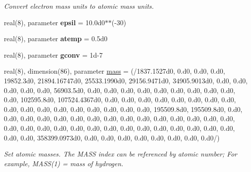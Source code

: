 \begin{DoxyCompactItemize}
\begin{DoxyCompactList}\small\item\em Convert electron mass units to atomic mass units. \end{DoxyCompactList}\item 
\mbox{\label{namespaceconstants_a20857cef9be2cb4adf2011fd70db3458}} 
real(8), parameter {\bfseries epsil} = 10.\+0d0$\ast$$\ast$(-\/30)
\item 
\mbox{\label{namespaceconstants_a69627ad3a30781eec0f177855b87a718}} 
real(8), parameter {\bfseries atemp} = 0.\+5d0
\item 
\mbox{\label{namespaceconstants_aa6a2522f7223637a44c105cd6071a9b4}} 
real(8), parameter {\bfseries gconv} = 1d-\/7
\item 
\mbox{\label{namespaceconstants_a43c37b4fb9951c15e43c401271bfbc38}} 
real(8), dimension(86), parameter \mbox{\hyperlink{namespaceconstants_a43c37b4fb9951c15e43c401271bfbc38}{mass}} = (/1837.\+1527d0, 0.\+d0, 0.\+d0, 0.\+d0, 19852.\+3d0, 21894.\+16747d0, 25533.\+1990d0, 29156.\+9471d0, 34905.\+9013d0, 0.\+d0, 0.\+d0, 0.\+d0, 0.\+d0, 0.\+d0, 56903.\+5d0, 0.\+d0, 0.\+d0, 0.\+d0, 0.\+d0, 0.\+d0, 0.\+d0, 0.\+d0, 0.\+d0, 0.\+d0, 0.\+d0, 102595.\+8d0, 107524.\+4367d0, 0.\+d0, 0.\+d0, 0.\+d0, 0.\+d0, 0.\+d0, 0.\+d0, 0.\+d0, 0.\+d0, 0.\+d0, 0.\+d0, 0.\+d0, 0.\+d0, 0.\+d0, 0.\+d0, 0.\+d0, 0.\+d0, 0.\+d0, 195509.\+8d0, 195509.\+8d0, 0.\+d0, 0.\+d0, 0.\+d0, 0.\+d0, 0.\+d0, 0.\+d0, 0.\+d0, 0.\+d0, 0.\+d0, 0.\+d0, 0.\+d0, 0.\+d0, 0.\+d0, 0.\+d0, 0.\+d0, 0.\+d0, 0.\+d0, 0.\+d0, 0.\+d0, 0.\+d0, 0.\+d0, 0.\+d0, 0.\+d0, 0.\+d0, 0.\+d0, 0.\+d0, 0.\+d0, 0.\+d0, 0.\+d0, 0.\+d0, 0.\+d0, 358399.\+0973d0, 0.\+d0, 0.\+d0, 0.\+d0, 0.\+d0, 0.\+d0, 0.\+d0, 0.\+d0, 0.\+d0/)
\begin{DoxyCompactList}\small\item\em Set atomic masses. The M\+A\+SS index can be referenced by atomic number; For example, M\+A\+S\+S(1) = mass of hydrogen. \end{DoxyCompactList}\item 
\mbox{\label{namespaceconstants_a3ed119ebb47f168aa241425883cf1f53}} 
$$
\end{DoxyCompactItemize}
